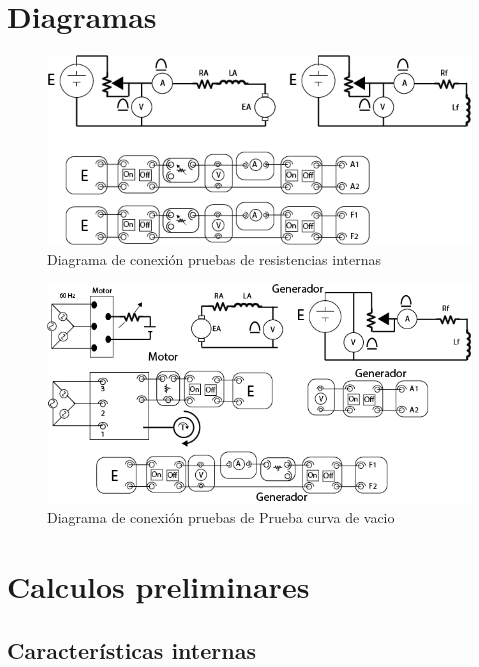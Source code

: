 \documentclass[11pt,letterpaper]{article}     %
\begin{document}
\section{Diagramas}
\begin{figure}[H]
    \centering
    \includegraphics[scale=0.5]{./recursos-Lab6/diagMedRes.png}
    \caption{Diagrama de conexión pruebas de resistencias internas}
    \label{fig:diagMedRes}
\end{figure}
\begin{figure}[H]
    \centering
    \includegraphics[scale=0.5]{./recursos-Lab6/diagMedCurvaVacio.png}
    \caption{Diagrama de conexión pruebas de Prueba curva de vacio}
    \label{fig:diagMedCurvaCaracteristica}
\end{figure}
\section{Calculos preliminares}
\subsection{Características internas}
\end{document}
